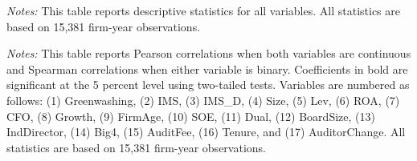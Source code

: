 \begin{landscape}
    \vspace*{-1.5cm}

    \begin{center}
    
    \label{tab:descriptive-statistics}
    
    \scriptsize
    
    \vspace{3pt}
    
    \begin{minipage}{0.75\linewidth}
    \footnotesize
    \textit{Notes:} This table reports descriptive statistics for all variables. All statistics are based on 15,381 firm-year observations.
    \end{minipage}
    
    \vspace{8pt}
    
    \label{tab:correlations}
    
    
    \vspace{3pt}
    
    \begin{minipage}{0.98\linewidth}
    \footnotesize
    \textit{Notes:} This table reports Pearson correlations when both variables are continuous and Spearman correlations when either variable is binary. Coefficients in bold are significant at the 5 percent level using two-tailed tests. Variables are numbered as follows: (1) Greenwashing, (2) IMS, (3) IMS\_D, (4) Size, (5) Lev, (6) ROA, (7) CFO, (8) Growth, (9) FirmAge, (10) SOE, (11) Dual, (12) BoardSize, (13) IndDirector, (14) Big4, (15) AuditFee, (16) Tenure, and (17) AuditorChange. All statistics are based on 15,381 firm-year observations.
    \end{minipage}
    
    \end{center}
    
    \end{landscape}
    